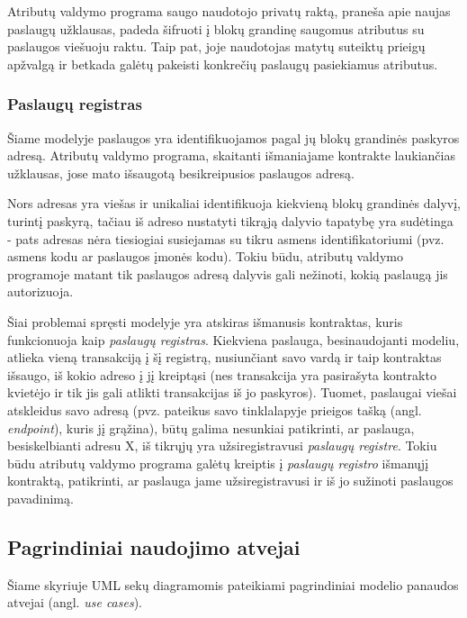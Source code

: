Atributų valdymo programa saugo naudotojo privatų raktą, praneša apie naujas paslaugų užklausas, padeda šifruoti
į blokų grandinę saugomus atributus su paslaugos viešuoju raktu. Taip pat, joje naudotojas
matytų suteiktų prieigų apžvalgą ir betkada galėtų pakeisti konkrečių paslaugų pasiekiamus atributus.

\subsubsection{Paslaugų registras} \label{BCIDM:serviceRegister}

Šiame modelyje paslaugos yra identifikuojamos pagal jų blokų grandinės paskyros adresą. Atributų valdymo programa,
skaitanti išmaniajame kontrakte laukiančias užklausas, jose mato išsaugotą besikreipusios paslaugos adresą.

Nors adresas yra viešas ir unikaliai identifikuoja kiekvieną blokų grandinės dalyvį, turintį paskyrą, tačiau iš adreso nustatyti tikrąją dalyvio tapatybę yra sudėtinga -
pats adresas nėra tiesiogiai susiejamas su tikru asmens identifikatoriumi (pvz. asmens kodu ar paslaugos įmonės kodu).
Tokiu būdu, atributų valdymo programoje matant tik paslaugos adresą dalyvis gali nežinoti, kokią paslaugą jis autorizuoja.

Šiai problemai spręsti modelyje yra atskiras išmanusis kontraktas, kuris funkcionuoja kaip \textit{paslaugų registras}. Kiekviena
paslauga, besinaudojanti modeliu, atlieka vieną transakciją į šį registrą, nusiunčiant savo vardą ir taip kontraktas išsaugo, iš kokio adreso į jį kreiptąsi (nes
transakcija yra pasirašyta kontrakto kvietėjo ir tik jis gali atlikti transakcijas iš jo paskyros). Tuomet, paslaugai viešai
atskleidus savo adresą (pvz. pateikus savo tinklalapyje prieigos tašką (angl. \textit{endpoint}), kuris jį grąžina), būtų galima
nesunkiai patikrinti, ar paslauga, besiskelbianti adresu X, iš tikrųjų yra užsiregistravusi \textit{paslaugų registre}. Tokiu būdu
atributų valdymo programa galėtų kreiptis į \textit{paslaugų registro} išmanųjį kontraktą, patikrinti, ar paslauga jame užsiregistravusi ir iš jo sužinoti paslaugos
pavadinimą. 

\subsection{Pagrindiniai naudojimo atvejai}

Šiame skyriuje UML sekų diagramomis pateikiami pagrindiniai modelio panaudos atvejai (angl. \textit{use cases}).

